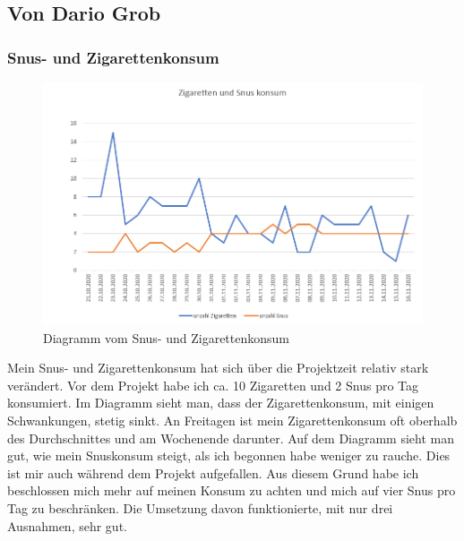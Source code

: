 \subsection{Von Dario Grob}
\authortoc{\dario}{\subsectionident}
\subsubsection{Snus- und Zigarettenkonsum}
\begin{figure}[H]
  \centering
  \includegraphics[width=0.7\linewidth]{./images/dario_tabak.PNG}
  \caption{Diagramm vom Snus- und Zigarettenkonsum}
\end{figure}
Mein Snus- und Zigarettenkonsum hat sich über die Projektzeit relativ stark verändert. Vor dem Projekt habe ich ca. 10 Zigaretten und 2 Snus pro Tag konsumiert. Im Diagramm sieht man, dass der Zigarettenkonsum, mit einigen Schwankungen, stetig sinkt. An Freitagen ist mein Zigarettenkonsum oft oberhalb des Durchschnittes und am Wochenende darunter.
\newline
Auf dem Diagramm sieht man gut, wie mein Snuskonsum steigt, als ich begonnen habe weniger zu rauche. Dies ist mir auch während dem Projekt aufgefallen. Aus diesem Grund habe ich beschlossen mich mehr auf meinen Konsum zu achten und mich auf vier Snus pro Tag zu beschränken. Die Umsetzung davon funktionierte, mit nur drei Ausnahmen, sehr gut.
